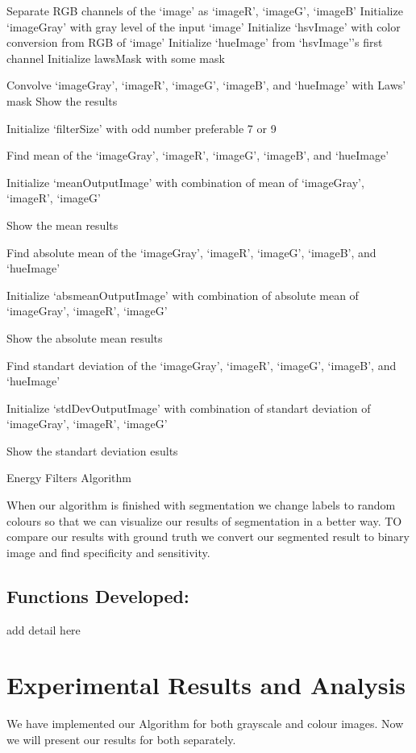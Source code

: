 \documentclass{article}
\begin{document}
\begin{algorithm}[H]
Separate RGB channels of the ‘image’ as  ‘imageR’,  ‘imageG’,  ‘imageB’\;
Initialize ‘imageGray’ with gray level of the  input ‘image’\;
Initialize  ‘hsvImage’ with color conversion from RGB of ‘image’\;
Initialize  ‘hueImage’ from ‘hsvImage’'s first channel\;
Initialize lawsMask with some mask\;

Convolve ‘imageGray’, ‘imageR’, ‘imageG’, ‘imageB’,  and ‘hueImage’ with Laws' mask\;
Show the results\;

Initialize ‘filterSize’ with odd number preferable 7 or 9\;

Find mean of the ‘imageGray’, ‘imageR’, ‘imageG’, ‘imageB’,  and ‘hueImage’\;

Initialize ‘meanOutputImage’ with combination of mean of ‘imageGray’, ‘imageR’, ‘imageG’\;

Show the mean results\;

Find absolute mean of the ‘imageGray’, ‘imageR’, ‘imageG’, ‘imageB’,  and ‘hueImage’\;

Initialize ‘absmeanOutputImage’ with combination of absolute mean of ‘imageGray’, ‘imageR’, ‘imageG’\;

Show the absolute mean results\;

Find standart deviation of the ‘imageGray’, ‘imageR’, ‘imageG’, ‘imageB’,  and ‘hueImage’\;

Initialize ‘stdDevOutputImage’ with combination of standart deviation of ‘imageGray’, ‘imageR’, ‘imageG’\;

Show the standart deviation esults\;

 \caption{Energy Filters Algorithm}
\end{algorithm}






When our algorithm is finished with segmentation we change labels to random colours so that we can visualize our results of segmentation in a better way. TO compare our results with ground truth we convert our segmented result to binary image and find specificity and sensitivity.
\subsection{Functions Developed:}
add detail here
\section{Experimental Results and Analysis}
We have implemented our Algorithm for both grayscale and colour images. Now we will present our results for both separately.
\end{document}
